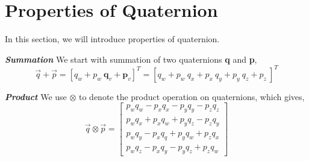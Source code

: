 \section{Properties of Quaternion}
\label{sec:prop_of_quat}

In this section, we will introduce properties of quaternion. 

\textbf{\textit{Summation}} We start with summation of two quaternions \textbf{q} and \textbf{p},
\begin{equation}\label{q7}
\vec{q} + \vec{p} = \left[q_w+p_w \ \mathbf{q}_v+\mathbf{p}_v\right]^T = \left[q_w+p_w \ q_x+p_x \ q_y+p_y \ q_z+p_z \ \right]^T
\end{equation}

\textbf{\textit{Product}} We use $\otimes$ to denote the product operation on quaternions, which gives,
\begin{equation}\label{q3}
	\vec{q} \otimes \vec{p} = \begin{bmatrix}
							  	p_wq_w-p_xq_x-p_yq_y-p_zq_z \\
							  	p_wq_x+p_xq_w+p_yq_z-p_zq_y \\
							  	p_wq_y-p_xq_q+p_yq_w+p_zq_x \\
							  	p_wq_z-p_xq_y-p_yq_z+p_zq_w 
							  \end{bmatrix}
\end{equation}

